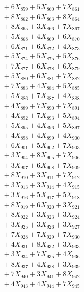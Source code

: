 \documentclass[a4paper,10pt]{article}
\begin{document}
{\begin{align}
&\;  + 6 X_{859} + 5 X_{860} + 7 X_{861} \\[0.3ex]
&\;  + 8 X_{862} + 6 X_{863} + 8 X_{864} \\[0.3ex]
&\;  + 8 X_{865} + 3 X_{866} + 7 X_{867} \\[0.3ex]
&\;  + 5 X_{868} + 4 X_{869} + 6 X_{870} \\[0.3ex]
&\;  + 6 X_{871} + 6 X_{872} + 4 X_{873} \\[0.3ex]
&\;  + 5 X_{874} + 5 X_{875} + 5 X_{876} \\[0.3ex]
&\;  + 7 X_{877} + 6 X_{878} + 6 X_{879} \\[0.5ex]\allowbreak
&\;  + 5 X_{880} + 6 X_{881} + 7 X_{882} \\[0.3ex]
&\;  + 7 X_{883} + 4 X_{884} + 5 X_{885} \\[0.3ex]
&\;  + 5 X_{886} + 7 X_{887} + 4 X_{888} \\[0.3ex]
&\;  + 4 X_{889} + 7 X_{890} + 7 X_{891} \\[0.3ex]
&\;  + 4 X_{892} + 7 X_{893} + 5 X_{894} \\[0.3ex]
&\;  + 5 X_{895} + 4 X_{896} + 5 X_{897} \\[0.3ex]
&\;  + 4 X_{898} + 4 X_{899} + 4 X_{900} \\[0.3ex]
&\;  + 6 X_{901} + 5 X_{902} + 7 X_{903} \\[0.3ex]
&\;  + 3 X_{904} + 8 X_{905} + 7 X_{906} \\[0.3ex]
&\;  + 3 X_{907} + 6 X_{908} + 7 X_{909} \\[0.5ex]\allowbreak
&\;  + 8 X_{910} + 3 X_{911} + 7 X_{912} \\[0.3ex]
&\;  + 3 X_{913} + 3 X_{914} + 4 X_{915} \\[0.3ex]
&\;  + 3 X_{916} + 5 X_{917} + 5 X_{918} \\[0.3ex]
&\;  + 8 X_{919} + 6 X_{920} + 3 X_{921} \\[0.3ex]
&\;  + 8 X_{922} + 3 X_{923} + 3 X_{924} \\[0.3ex]
&\;  + 3 X_{925} + 3 X_{926} + 3 X_{927} \\[0.3ex]
&\;  + 7 X_{928} + 7 X_{929} + 7 X_{930} \\[0.3ex]
&\;  + 4 X_{931} + 8 X_{932} + 3 X_{933} \\[0.3ex]
&\;  + 3 X_{934} + 7 X_{935} + 4 X_{936} \\[0.3ex]
&\;  + 8 X_{937} + 4 X_{938} + 3 X_{939} \\[0.5ex]\allowbreak
&\;  + 7 X_{940} + 3 X_{941} + 8 X_{942} \\[0.3ex]
&\;  + 4 X_{943} + 4 X_{944} + 7 X_{945} \\[0.3ex]

\end{align}}
\end{document}
